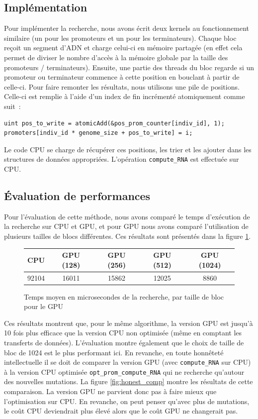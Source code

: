 \documentclass{article}
\begin{document}
\subsection{Implémentation}

Pour implémenter la recherche, nous avons écrit deux kernels au fonctionnement similaire (un pour les promoteurs et un pour les terminateurs). Chaque bloc reçoit un segment d'ADN et charge celui-ci en mémoire partagée (en effet cela permet de diviser le nombre d'accès à la mémoire globale par la taille des promoteurs / terminateurs). Ensuite, une partie des threads du bloc regarde si un promoteur ou terminateur commence à cette position en bouclant à partir de celle-ci. Pour faire remonter les résultats, nous utilisons une pile de positions. Celle-ci est remplie à l'aide d'un index de fin incrémenté atomiquement comme suit~:

\begin{verbatim}
uint pos_to_write = atomicAdd(&pos_prom_counter[indiv_id], 1);
promoters[indiv_id * genome_size + pos_to_write] = i;
\end{verbatim}

Le code CPU se charge de récupérer ces positions, les trier et les ajouter dans les structures de données appropriées. L'opération \verb|compute_RNA| est effectuée sur CPU.

\subsection{Évaluation de performances}

Pour l'évaluation de cette méthode, nous avons comparé le temps d'exécution de la recherche sur CPU et GPU, et pour GPU nous avons comparé l'utilisation de plusieurs tailles de blocs différentes. Ces résultats sont présentés dans la figure \ref{fig:search_comp}.

\begin{figure}[H]
\centering
\begin{tabular}{|c|c|c|c|c|}
    \hline
    CPU & GPU (128) & GPU (256) & GPU (512)  & GPU (1024) \\
    \hline
    92104 & 16011 & 15862 & 12025 & 8860 \\
    \hline
\end{tabular}
\caption{Temps moyen en microsecondes de la recherche, par taille de bloc pour le GPU}
\label{fig:search_comp}
\end{figure}

Ces résultats montrent que, pour le même algorithme, la version GPU est jusqu'à 10 fois plus efficace que la version CPU non optimisée (même en comptant les transferts de données). L'évaluation montre également que le choix de taille de bloc de 1024 est le plus performant ici. En revanche, en toute honnêteté intellectuelle il se doit de comparer la version GPU (avec \verb|compute_RNA| sur CPU) à la version CPU optimisée \verb|opt_prom_compute_RNA| qui ne recherche qu'autour des nouvelles mutations. La figure \ref{fig:honest_comp} montre les résultats de cette comparaison. La version GPU ne parvient donc pas à faire mieux que l'optimisation sur CPU. En revanche, on peut penser qu'avec plus de mutations, le coût CPU deviendrait plus élevé alors que le coût GPU ne changerait pas.
\end{document}
